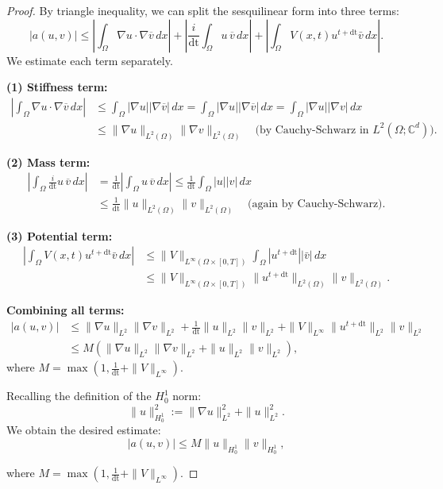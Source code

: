 \documentclass{article}
\theoremstyle{definition}
\theoremstyle{plain}
\theoremstyle{remark}
\newcommand{\dt}{\text{dt}}
\begin{document}
\begin{proof}
By triangle inequality, we can split the sesquilinear form into three terms:
\[
|a(u, v)| \leq |\int_\Omega \nabla u \cdot \nabla \overline{v} \, dx| + \left| \frac{i}{\dt} \int_\Omega u \, \overline{v} \, dx \right| + \left| \int_\Omega V(x,t) u^{t + \dt} \bar{v} \, dx \right|.
\]
We estimate each term separately.

\textbf{(1) Stiffness term:}
\begin{align*}
  \left| \int_\Omega \nabla u \cdot \nabla \overline{v} \, dx \right| &\leq \int_\Omega |\nabla u| |\nabla \overline{v}| \, dx = \int_\Omega |\nabla u| |\nabla \overline{v}| \, dx = \int_\Omega |\nabla u| |\nabla v| \, dx \\
  & \leq \|\nabla u\|_{L^2(\Omega)} \|\nabla v\|_{L^2(\Omega)}
\quad \text{(by Cauchy-Schwarz in } L^2(\Omega; \mathbb{C}^d) \text{)}.
\end{align*}


\textbf{(2) Mass term:}
\begin{align*}
\left| \int_\Omega \frac{i}{\dt} u \, \overline{v} \, dx \right|
&= \frac{1}{\dt} \left| \int_\Omega u \, \overline{v} \, dx \right| \leq \frac{1}{\dt} \int_\Omega |u| |v| \, dx \\
& \leq \frac{1}{\dt} \|u\|_{L^2(\Omega)} \|v\|_{L^2(\Omega)} \quad \text{(again by Cauchy-Schwarz)}.
\end{align*}


\textbf{(3) Potential term:}
\begin{align*}
\left| \int_\Omega V(x,t) u^{t + \dt} \bar{v} \, dx \right| &\leq \|V\|_{L^\infty(\Omega \times [0,T])} \int_\Omega |u^{t + \dt}| |\bar{v}| \, dx \\
&\leq \|V\|_{L^\infty(\Omega \times [0,T])} \|u^{t + \dt}\|_{L^2(\Omega)} \|v\|_{L^2(\Omega)}.
\end{align*}

\textbf{Combining all terms:}
\begin{align*}
|a(u, v)| &\leq \|\nabla u\|_{L^2} \|\nabla v\|_{L^2} + \frac{1}{\dt} \|u\|_{L^2} \|v\|_{L^2} + \|V\|_{L^\infty} \|u^{t + \dt}\|_{L^2} \|v\|_{L^2}\\
& \leq M \left( \|\nabla u\|_{L^2} \|\nabla v\|_{L^2} + \|u\|_{L^2} \|v\|_{L^2} \right),
\end{align*}
where \( M = \max\left(1, \frac{1}{\dt} + \|V\|_{L^\infty}\right) \).


Recalling the definition of the \(H_0^1\) norm:
\[
\|u\|_{H_0^1}^2 := \|\nabla u\|_{L^2}^2 + \|u\|_{L^2}^2.
\]
We obtain the desired estimate:
$$|a(u, v)| \leq M \|u\|_{H_0^1} \|v\|_{H_0^1},$$

where \( M = \max\left(1, \frac{1}{\dt} + \|V\|_{L^\infty}\right) \).
\end{proof}
\end{document}
